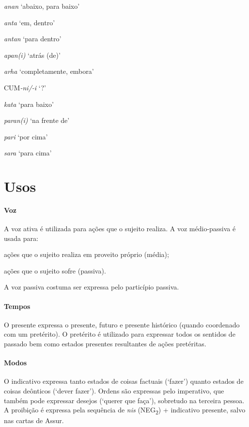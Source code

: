 \begin{multicols}{2}
	\begin{compactenum}[(a)]
		\item *\emph{anan} `abaixo, para baixo'
		\item \emph{anta} `em, dentro'
		\item \emph{antan} `para dentro'
		\item \emph{apan{(i)}} `atrás (de)'
		\item \emph{arha} `completamente, embora'
		\item CUM\emph{-ni/-i} `?'
		\item *\emph{kata} `para baixo'
		\item \emph{paran{(i)}} `na frente de'
		\item \emph{pari} `por cima'
		\item \emph{sara} `para cima'
	\end{compactenum}
\end{multicols}

\section{Usos}

\paragraph{Voz}
A voz ativa é utilizada para ações que o sujeito realiza.
A voz médio-passiva é usada para:
\begin{inparaenum}[(a)]
	\item ações que o sujeito realiza em proveito próprio (média);
	\item ações que o sujeito sofre (passiva).
\end{inparaenum}
A voz passiva costuma ser expressa pelo particípio passiva.


\paragraph{Tempos}
O presente expressa o presente, futuro e presente histórico (quando coordenado
com um pretérito).
O pretérito é utilizado para expressar todos os sentidos de passado bem como
estados presentes resultantes de ações pretéritas.


\paragraph{Modos}
O indicativo expressa tanto estados de coisas factuais (`fazer') quanto estados de coisas
deônticos (`dever fazer').
Ordens são expressas pelo imperativo, que também pode expressar desejos (`querer
que faça'), sobretudo na terceira pessoa.
A proibição é expressa pela sequência de \emph{nis} (NEG\textsubscript{2}) +
indicativo presente, salvo nas cartas de Assur.

